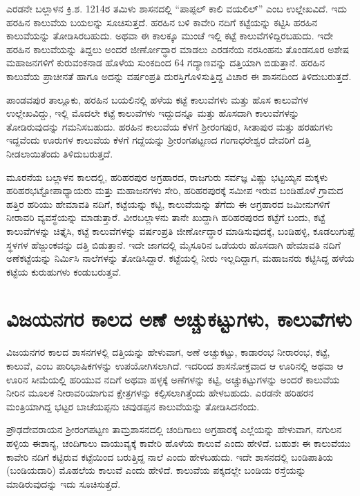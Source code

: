 ಎರಡನೇ ಬಲ್ಲಾಳನ ಕ್ರಿ.ಶ. 1214ರ ತಮಿಳು ಶಾಸನದಲ್ಲಿ “ಪಾಪ್ಪಲ್​ ಕಾಲಿ ವಯಲಿಲ್​” ಎಂಬ ಉಲ್ಲೇಖವಿದೆ. ಇದು ಹರಹಿನ ಕಾಲುವೆಯ ಬಯಲನ್ನು ಸೂಚಿಸುತ್ತದೆ. ಹರಹಿನ ಬಳಿ ಕಾವೇರಿ ನದಿಗೆ ಕಟ್ಟೆಯನ್ನು ಕಟ್ಟಿಸಿ ಹರಹಿನ ಕಾಲುವೆಯನ್ನು ತೋಡಿಸಿರಬಹುದು. ಅಥವಾ ಈ ಕಾಲಕ್ಕೂ ಮುಂಚೆ ಇಲ್ಲಿ ಕಟ್ಟೆ ಕಾಲುವೆಗಳಿದ್ದಿರಬಹುದು. ಇದೇ ಹರಹಿನ ಕಾಲುವೆಯನ್ನು ತಿದ್ದಲು ಅಂದರೆ ಜೀರ್ಣೋದ್ಧಾರ ಮಾಡಲು ಎರಡನೆಯ ನರಸಿಂಹನು ತೊಂಡನೂರ ಅಶೇಷ ಮಹಾಜನಗಳಿಗೆ ಕುರುವಂಕನಾಡ ಹೊಳೆಯ ಸುಂಕದಿಂದ 64 ಗದ್ಯಾಣವನ್ನು ದತ್ತಿಯಾಗಿ ಬಿಡುತ್ತಾನೆ. ಹರಹಿನ ಕಾಲುವೆಯ ಪ್ರಾಚೀನತೆ ಹಾಗೂ ಅದನ್ನು ವರ್ಷಂಪ್ರತಿ ದುರಸ್ತಿಗೊಳಿಸುತ್ತಿದ್ದ ವಿಚಾರ ಈ ಶಾಸನದಿಂದ ತಿಳಿದುಬರುತ್ತದೆ.

ಪಾಂಡವಪುರ ತಾಲ್ಲೂಕು, ಹರಹಿನ ಬಯಲಿನಲ್ಲಿ ಹಳೆಯ ಕಟ್ಟೆ ಕಾಲುವೆಗಳು ಮತ್ತು ಹೊಸ ಕಾಲುವೆಗಳ ಉಲ್ಲೇಖವಿದ್ದು, ಇಲ್ಲಿ ಮೊದಲೇ ಕಟ್ಟೆ ಕಾಲುವೆಗಳು ಇದ್ದುದನ್ನೂ ಮತ್ತು ಹೊಸದಾಗಿ ಕಾಲುವೆಗಳನ್ನು ತೋಡಿರುವುದನ್ನು ಗಮನಿಸಬಹುದು. ಹರಹಿನ ಕಾಲುವೆಯ ಕೆಳಗೆ ಶ‍್ರೀರಂಗಪುರ, ಸೀತಾಪುರ ಮತ್ತು ಹರಹುಗಳು ಇದ್ದವೆಂದು ಊರುಗಳ ಕಾಲುವೆಯ ಕೆಳಗೆ ಗದ್ದೆಯನ್ನು ಶ‍್ರೀರಂಗಪಟ್ಟಣದ ಗಂಗಾಧರೇಶ್ವರ ದೇವರಿಗೆ ದತ್ತಿ ನೀಡಲಾಯಿತೆಂದು ತಿಳಿದುಬರುತ್ತದೆ.

ಮೂರನೆಯ ಬಲ್ಲಾಳನ ಕಾಲದಲ್ಲಿ, ಹರಿಹರಪುರ ಅಗ್ರಹಾರದ, ರಾಜಗುರು ಸರ್ವಜ್ಞ ವಿಷ್ಣು ಭಟ್ಟಯ್ಯನ ಮಕ್ಕಳು ಹರಿಹರಭಟ್ಟೋಪಾಧ್ಯಾಯರು ಮತ್ತು ಮಹಾಜನಗಳು ಸೇರಿ, ಹರಿಹರಪುರಕ್ಕೆ ಸಮೀಪ ಇರುವ ಬಂಡಿಹೊಳೆ ಗ್ರಾಮದ ಹತ್ತಿರ ಹರಿಯು ಹೇಮಾವತಿ ನದಿಗೆ, ಕಟ್ಟೆಯನ್ನು ಕಟ್ಟಿ, ಕಾಲುವೆಯನ್ನು ತೆಗೆದು ಈ ಅಗ್ರಹಾರದ ಜಮೀನುಗಳಿಗೆ ನೀರಾವರಿ ವ್ಯವಸ್ಥೆಯನ್ನು ಮಾಡುತ್ತಾರೆ. ವೀರಬಲ್ಲಾಳನು ತಾನೇ ಖುದ್ದಾಗಿ ಹರಿಹರಪುರದ ಕಟ್ಟೆಗೆ ಬಂದು, ಕಟ್ಟೆ ಕಾಲುವೆಗಳನ್ನು ಚಿತ್ತೈಸಿ, ಕಟ್ಟೆ ಕಾಲುವೆಗಳನ್ನು ವರ್ಷಂಪ್ರತಿ ಜೀರ್ಣೋದ್ಧಾರ ಮಾಡಿಸುವುದಕ್ಕೆ, ಬಂಡಿಹಳ್ಳಿ, ಕೂಡಲುಗುಪ್ಪೆ ಸ್ಥಳಗಳ ಹೆಜ್ಜುಂಕವನ್ನು ದತ್ತಿ ಬಿಡುತ್ತಾನೆ. ಇದೇ ಜಾಗದಲ್ಲಿ ಮೈಸೂರಿನ ಒಡೆಯರು ಹೊಸದಾಗಿ ಹೇಮಾವತಿ ನದಿಗೆ ಅಣೆಕಟ್ಟೆಯನ್ನು ನಿರ್ಮಿಸಿ ನಾಲೆಗಳನ್ನು ತೋಡಿಸಿದ್ದಾರೆ. ಕಟ್ಟೆಯಲ್ಲಿ ನೀರು ಇಲ್ಲದಿದ್ದಾಗ, ಮಹಾಜನರು ಕಟ್ಟಿಸಿದ್ದ ಹಳೆಯ ಕಟ್ಟೆಯ ಕುರುಹುಗಳು ಕಂಡುಬರುತ್ತವೆ.


\section{ವಿಜಯನಗರ ಕಾಲದ ಅಣೆ ಅಚ್ಚುಕಟ್ಟುಗಳು, ಕಾಲುವೆಗಳು}

ವಿಜಯನಗರ ಕಾಲದ ಶಾಸನಗಳಲ್ಲಿ ದತ್ತಿಯನ್ನು ಹೇಳುವಾಗ, ಅಣೆ ಅಚ್ಚುಕಟ್ಟು, ಕಾಡಾರಂಭ ನೀರಾರಂಭ, ಕಟ್ಟೆ, ಕಾಲುವೆ, ಎಂಬ ಪಾರಿಭಾಷಿಕಗಳನ್ನು ಉಪಯೋಗಿಸಲಾಗಿದೆ. ಇದರಿಂದ ಶಾಸನೋಕ್ತವಾದ ಆ ಊರಿನಲ್ಲಿ ಅಥವಾ ಆ ಊರಿನ ಸೀಮೆಯಲ್ಲಿ ಹರಿಯುವ ನದಿಗೆ ಅಥವಾ ಹಳ್ಳಕ್ಕೆ ಅಣೆಗಳನ್ನು ಕಟ್ಟಿ, ಅಚ್ಚುಕಟ್ಟುಗಳನ್ನು ಅಂದರೆ ಕಾಲುವೆಯ ನೀರಿನ ಮೂಲಕ ನೀರಾವರಿಯಾಗುವ ಕ್ಷೇತ್ರಗಳನ್ನು ಕಲ್ಪಿಸಲಾಗಿತ್ತೆಂದು ಹೇಳಬಹುದು. ಎರಡನೇ ಹರಿಹರನ ಮಂತ್ರಿಯಾಗಿದ್ದ ಭಟ್ಟರ ಬಾಚೆಯಪ್ಪನು ಚವುಡಪ್ಪನ ಕಾಲುವೆಯನ್ನು ತೋಡಿಸಿದನೆಂದು.

ಪ್ರೌಢದೇವರಾಯನ ಶ‍್ರೀರಂಗಪಟ್ಟಣ ತಾಮ್ರಶಾಸನದಲ್ಲಿ ಚಂದಿಗಾಲು ಅಗ್ರಹಾರಕ್ಕೆ ಎಲ್ಲೆಯನ್ನು ಹೇಳುವಾಗ, ನಗುಲನ ಹಳ್ಳಿಯ ಈಶಾನ್ಯ, ಚಂದಿಗಾಲು ವಾಯುವ್ಯಕ್ಕೆ ಕಾವೇರಿ ಹೊಳೆಯ ಕಾಲುವೆ ಎಂದು ಹೇಳಿದೆ. ಬಹುಶಃ ಈ ಕಾಲುವೆಯು ಕಾವೇರಿ ನದಿಗೆ ಕಟ್ಟಿರುವ ಕಟ್ಟೆಯಿಂದ ಬರುತ್ತಿದ್ದ ನಾಲೆ ಎಂದು ಹೇಳಬಹುದು. ಇದೇ ಶಾಸನದಲ್ಲಿ ಬಂಡಿಪಾತಿಯ (ಬಂಡಿಯದಾರಿ) ಮೊಹಲೆಯ ಕಾಲುವೆ ಎಂದು ಹೇಳಿದೆ. ಕಾಲುವೆಯ ಪಕ್ಕದಲ್ಲೇ ಬಂಡಿಯ ರಸ್ತೆಯನ್ನು ಮಾಡಿರುವುದನ್ನು ಇದು ಸೂಚಿಸುತ್ತದೆ.

